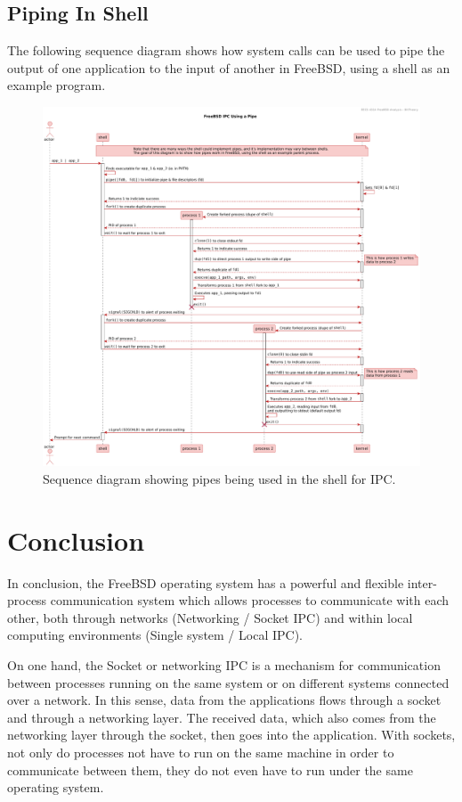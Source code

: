 \documentclass[12pt, dvipsnames, a4paper]{article}
\begin{document}
\subsection{Piping In Shell}
The following sequence diagram shows how system calls can be used to pipe the
output of one application to the input of another in FreeBSD, using a shell
as an example program.
\begin{figure}[!htb]
	\advance\leftskip-0.5cm
	\includegraphics[width = 570pt]{assets/use_case_diagrams/pipe.pdf}
	\caption{Sequence diagram showing pipes being used in the shell for IPC. \cite{pipe}\cite{fork}\cite{wait}\cite{close}\cite{dup}\cite{execve}\cite{signal}\cite{pipe-explained}}
\end{figure}

\clearpage
\section{Conclusion}
In conclusion, the FreeBSD operating system has a powerful and flexible inter-process communication system which allows processes to communicate with each other, both through networks (Networking / Socket IPC) and within local computing environments (Single system / Local IPC).

On one hand, the Socket or networking IPC is a mechanism for communication between processes running on the same system or on different systems connected over a network. In this sense, data from the applications flows through a socket and through a networking layer. The received data, which also comes from the networking layer through the socket, then goes into the application. With sockets, not only do processes not have to run on the same machine in order to communicate between them, they do not even have to run under the same operating system.
\end{document}
